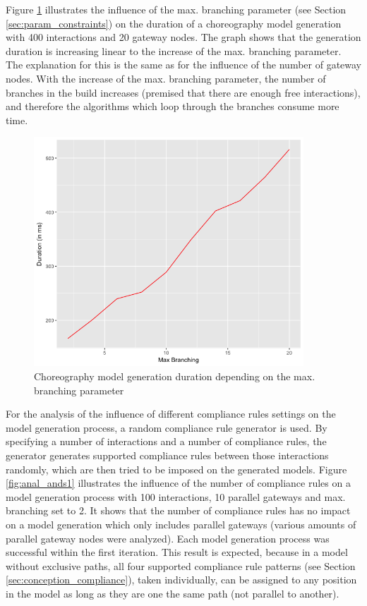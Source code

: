 Figure \ref{fig:anal_branching} illustrates the influence of the max. branching parameter (see Section \ref{sec:param_constraints}) on the duration of a choreography model generation with 400 interactions and 20 gateway nodes. The graph shows that the generation duration is increasing linear to the increase of the max. branching parameter. The explanation for this is the same as for the influence of the number of gateway nodes. With the increase of the max. branching parameter, the number of branches in the build increases (premised that there are enough free interactions), and therefore the algorithms which loop through the branches consume more time.

\begin{figure}[htb]
\centering
\includegraphics[width=0.9\textwidth]{src/images/analysis_branching.png}
\caption{Choreography model generation duration depending on the max. branching parameter}
\label{fig:anal_branching}
\end{figure}

For the analysis of the influence of different compliance rules settings on the model generation process, a random compliance rule generator is used. By specifying a number of interactions and a number of compliance rules, the generator generates supported compliance rules between those interactions randomly, which are then tried to be imposed on the generated models. Figure \ref{fig:anal_ands1} illustrates the influence of the number of compliance rules on a model generation process with 100 interactions, 10 parallel gateways and max. branching set to 2. It shows that the number of compliance rules has no impact on a model generation which only includes parallel gateways (various amounts of parallel gateway nodes were analyzed). Each model generation process was successful within the first iteration. This result is expected, because in a model without exclusive paths, all four supported compliance rule patterns (see Section \ref{sec:conception_compliance}), taken individually, can be assigned to any position in the model as long as they are one the same path (not parallel to another). 

